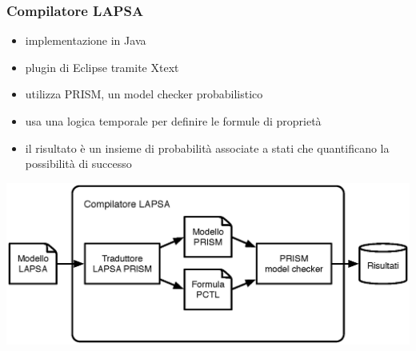 \documentclass[10pt]{beamer}
\begin{document}
	\begin{frame}
		\frametitle{Compilatore LAPSA}
		\begin{itemize}
			\item implementazione in \alert{Java}
			\item plugin di Eclipse tramite \alert{Xtext}
			\item utilizza \alert{PRISM}, un model checker probabilistico
			\item usa una \alert{logica temporale} per definire le formule di proprietà
			\item il risultato è un insieme di probabilità associate a stati che quantificano la possibilità di successo
		\end{itemize}
		\begin{center}
			\includegraphics[width=.7\textwidth]{Images/lapsa}
		\end{center}
		
	\end{frame}
\end{document}
